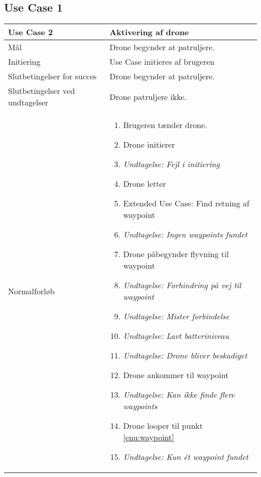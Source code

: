 \documentclass[Main]{subfiles}
\begin{document}
\subsection{Use Case 1}

\begin{longtable}{|p{}|p{}|}
\hline
Use Case 2 	& Aktivering af drone \\ \hline

Mål 		& Drone begynder at patruljere. \\ \hline

Initiering	& Use Case initieres af brugeren \\ \hline

Slutbetingelser for succes & 
Drone begynder at patruljere.  \\ \hline

Slutbetingelser ved undtagelser & 
Drone patruljere ikke. \\ \hline

Normalforløb &	\vspace{-8mm}
	\begin{enumerate}[noitemsep,nolistsep,leftmargin=*]
	\item Brugeren tænder drone.
	\item Drone initierer
	\item[] \textit{Undtagelse: Fejl i initiering}
	\item Drone letter
	\item \label{enu:waypoint} Extended Use Case: Find retning af waypoint
	\item[] \textit{Undtagelse: Ingen waypoints fundet}
	\item \label{enu:flyvning} Drone påbegynder flyvning til waypoint
	\item[] \textit{Undtagelse: Forhindring på vej til waypoint}
	\item[] \textit{Undtagelse: Mister forbindelse}
	\item[] \textit{Undtagelse: Lavt batteriniveau}
	\item[] \textit{Undtagelse: Drone bliver beskadiget}
	\item Drone ankommer til waypoint
	\item[] \textit{Undtagelse: Kan ikke finde flere waypoints}
	\item Drone looper til punkt \ref{enu:waypoint}
	\item[] \textit{Undtagelse: Kun ét waypoint fundet}
	\end{enumerate} \\ \hline


\end{longtable}
\end{document}
